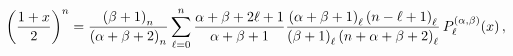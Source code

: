 \[\left(\frac{1+x}{2}\right)^{n}=\frac{\left(\beta+1\right)_{n}}{\left(\alpha+%
\beta+2\right)_{n}}\sum_{\ell=0}^{n}\frac{\alpha+\beta+2\ell+1}{\alpha+\beta+1%
}\frac{\left(\alpha+\beta+1\right)_{\ell}\left(n-\ell+1\right)_{\ell}}{\left(%
\beta+1\right)_{\ell}\left(n+\alpha+\beta+2\right)_{\ell}}\mathop{P^{(\alpha,%
\beta)}_{\ell}\/}\nolimits\!\left(x\right),\]